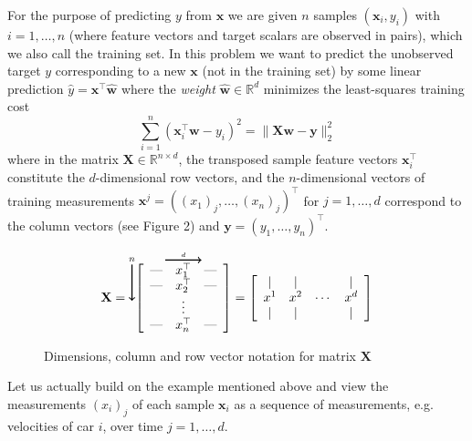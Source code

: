 \documentclass{article}\usepackage[utf8]{inputenc}\usepackage[margin=0.4cm,top=0.4cm,bottom=0.4cm]{geometry}\usepackage[usenames,dvipsnames,svgnames,table]{xcolor}
\begin{document}
\noindent For the purpose of predicting $y$ from $\mathbf{x}$ we are given $n$ samples $(\mathbf{x}_i, y_i)$ with $i = 1,\dots, n$ (where feature vectors and target scalars are observed in pairs), which we also call the training set. In this problem we want to predict the unobserved target $y$ corresponding to a new $\mathbf{x}$ (not in the training set) by some linear prediction $\hat{y} = \mathbf{x}^\top\hat{\mathbf{w}}$ where the \textit{weight} $\widehat{\mathbf{w}} \in \mathbb{R}^d$ minimizes the least-squares training cost $$\sum_{i=1}^n (\mathbf{x}_i^\top\mathbf{w} - y_i )^2 = \|\mathbf{X} \mathbf{w} - \mathbf{y} \|_2^2$$ where in the matrix $\mathbf{X} \in \mathbb{R}^{n\times d}$, the transposed sample feature vectors $\mathbf{x}_i^\top$ constitute the $d$-dimensional row vectors, and the $n$-dimensional vectors of training measurements $\mathbf{x}^j = (({x_1})_{j}, \dots, ({x_n})_{j})^\top$ for $j = 1,\dots, d$ correspond to the column vectors (see Figure 2) and $\mathbf{y} = (y_1, \dots, y_n)^\top$.
\begin{figure}[H]$$\mathbf{X} =\overset{n}{\begin{tikzpicture}\draw[->,line width=0.9pt] (-3,-3) to (-3,-4);\end{tikzpicture}}\overset{\overset{d}{\begin{tikzpicture}\draw[->,line width=0.9pt] (-7,0) to (-6,0);\end{tikzpicture}}}{\left[\begin{array}{ccc}\text{\textemdash} & x_1^\top & \text{\textemdash} \\\text{\textemdash} & x_2^\top & \text{\textemdash} \\ & \vdots &  \\\text{\textemdash} & x_n^\top & \text{\textemdash}\end{array}\right]}=\left[\begin{array}{cccc}| & | &   & | \\x^1 & x^2 & \cdots & x^d \\| & | &   & |\end{array}\right]$$\caption{Dimensions, column and row vector notation for matrix $\mathbf{X}$}\end{figure}
\noindent Let us actually build on the example mentioned above and view the measurements $({x_i})_{j}$ of each sample $\mathbf{x}_i$ as a sequence of measurements, e.g. velocities of car $i$, over time $j = 1,\dots, d$.
\end{document}
